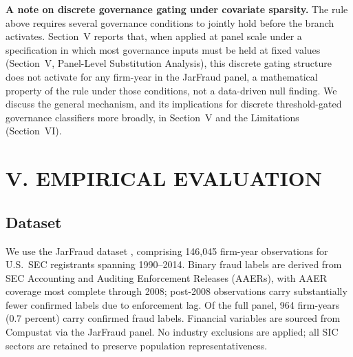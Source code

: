 \documentclass[12pt]{article}
\begin{document}
\textbf{A note on discrete governance gating under covariate sparsity.}
The rule above requires several governance conditions to jointly hold
before the branch activates.  Section~V reports that, when applied at
panel scale under a specification in which most governance inputs must
be held at fixed values (Section~V, Panel-Level Substitution Analysis),
this discrete gating structure does not activate for any firm-year in
the JarFraud panel, a mathematical property of the rule under those
conditions, not a data-driven null finding.  We discuss the general
mechanism, and its implications for discrete threshold-gated governance
classifiers more broadly, in Section~V and the Limitations
(Section~VI).

\section*{\centering V. EMPIRICAL EVALUATION}
\label{sec:eval}

\subsection*{Dataset}

We use the JarFraud dataset \citep{bao2020}, comprising 146{,}045 firm-year
observations for U.S.\ SEC registrants spanning 1990--2014.  Binary fraud
labels are derived from SEC Accounting and Auditing Enforcement Releases
(AAERs), with AAER coverage most complete through 2008; post-2008
observations carry substantially fewer confirmed labels due to enforcement
lag.  Of the full panel, 964 firm-years (0.7 percent) carry confirmed fraud
labels.  Financial variables are sourced from Compustat via the JarFraud
panel.  No industry exclusions are applied; all SIC sectors are retained to
preserve population representativeness.
\end{document}
